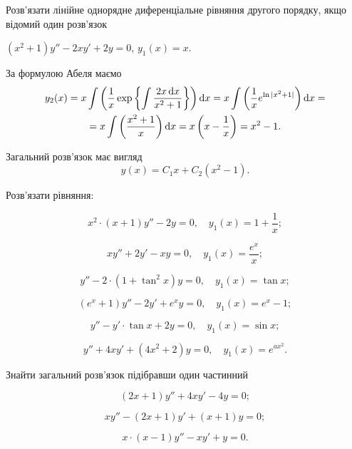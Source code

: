 Розв'язати лінійне однорядне диференціальне рівняння другого порядку, якщо відомий один розв'язок

\begin{example}
	$(x^2 + 1) y'' - 2 x y' + 2 y = 0$, $y_1(x) = x$.
\end{example}

\begin{solution}
	За формулою Абеля маємо
	\begin{multline*}
		y_2(x) = x \int \left(\frac{1}{x} \exp \left\{ \int \frac{2x\mathop{}\!\mathrm{d} x}{x^2+1} \right\} \right) \mathop{}\!\mathrm{d} x = x \int \left(\frac{1}{x} e^{\ln |x^2 + 1|} \right) \mathop{}\!\mathrm{d} x = \\ = x \int \left(\frac{x^2 + 1}{x} \right) \mathop{}\!\mathrm{d} x = x \left( x - \frac1x \right) = x^2 - 1.
	\end{multline*}
	
	Загальний розв'язок має вигляд \[ y(x) = C_1 x + C_2 (x^2 - 1).\]
\end{solution}

Розв'язати рівняння: 
\begin{problem}
	\[x^2\cdot(x+1)y''-2y=0,\quad y_1(x)=1+\frac1x;\]
\end{problem}

\begin{problem}
	\[xy''+2y'-xy=0,\quad y_1(x)=\frac{e^x}{x};\]
\end{problem}

\begin{problem}
	\[y''-2\cdot(1+\tan^2 x)y=0,\quad y_1(x)=\tan x;\]
\end{problem}

\begin{problem}
	\[(e^x+1)y''-2y'+e^xy=0,\quad y_1(x)=e^x-1;\]
\end{problem}

\begin{problem}
	\[y''-y'\cdot\tan x+2y=0,\quad y_1(x)=\sin x;\]
\end{problem}

\begin{problem}
	\[y''+4xy'+(4x^2+2)y=0,\quad y_1(x)=e^{a x^2}.\]
\end{problem}

Знайти загальний розв'язок підібравши один частинний
\begin{problem}
	\[(2x+1)y''+4xy'-4y=0;\]
\end{problem}

\begin{problem}
	\[xy''-(2x+1)y'+(x+1)y=0;\]
\end{problem}

\begin{problem}
	\[x\cdot(x-1)y''-xy'+y=0.\]
\end{problem}